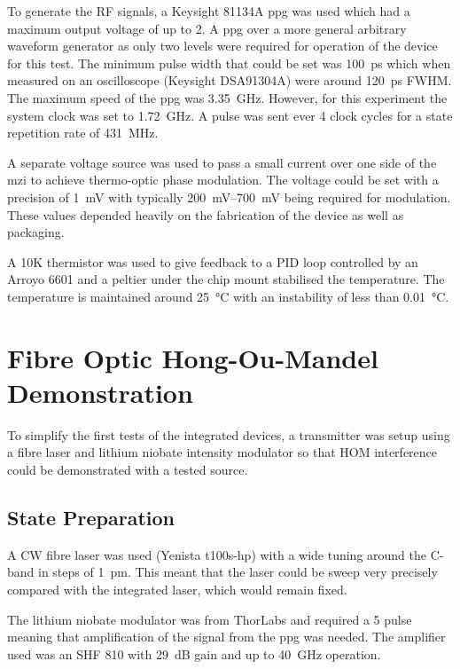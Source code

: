 To generate the RF signals, a Keysight 81134A \ac{ppg} was used which had a maximum output voltage of up to \SI{2}{\Vpp}. A \ac{ppg} over a more general arbitrary waveform generator as only two levels were required for operation of the device for this test. The minimum pulse width that could be set was \SI{100}{\ps} which when measured on an oscilloscope (Keysight DSA91304A) were around \SI{120}{\ps} \ac{FWHM}. The maximum speed of the \ac{ppg} was \SI{3.35}{\GHz}. However, for this experiment the system clock was set to \SI{1.72}{\GHz}. A pulse was sent ever 4 clock cycles for a state repetition rate of \SI{431}{\MHz}.

A separate voltage source was used to pass a small current over one side of the \ac{mzi} to achieve thermo-optic phase modulation. The voltage could be set with a precision of \SI{1}{\mV} with typically \SIrange{200}{700}{\mV} being required for modulation. These values depended heavily on the fabrication of the device as well as packaging.

A 10K thermistor was used to give feedback to a PID loop controlled by an Arroyo 6601 and a peltier under the chip mount stabilised the temperature. The temperature is maintained around \SI{25}{\celsius} with an instability of less than \SI{0.01}{\celsius}. 

\section{Fibre Optic Hong-Ou-Mandel Demonstration}

To simplify the first tests of the integrated devices, a transmitter was setup using a fibre laser and lithium niobate intensity modulator so that \ac{HOM} interference could be demonstrated with a tested source. 

\subsection{State Preparation}

A \ac{CW} fibre laser was used (Yenista t100s-hp) with a wide tuning around the C-band in steps of \SI{1}{\pm}. This meant that the laser could be sweep very precisely compared with the integrated laser, which would remain fixed.

The lithium niobate modulator was from ThorLabs and required a \SI{5}{\Vpp} pulse meaning that amplification of the signal from the \ac{ppg} was needed. The amplifier used was an SHF 810 with \SI{29}{dB} gain and up to \SI{40}{\GHz} operation. 

